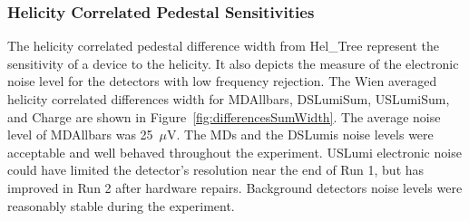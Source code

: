 \subsubsection{Helicity Correlated Pedestal Sensitivities}
\label{Helicity Correlated Pedestal Sensitivities}
The helicity correlated pedestal difference width from Hel\_Tree represent the sensitivity of a device to the helicity. It also depicts the measure of the electronic noise level for the detectors with low frequency rejection. The Wien averaged helicity correlated differences width for MDAllbars, DSLumiSum, USLumiSum, and Charge are shown in Figure~\ref{fig:differencesSumWidth}. The average noise level of MDAllbars was 25~$\mu$V.
The MDs and the DSLumis noise levels were acceptable and well behaved throughout the experiment. USLumi electronic noise could have limited the detector's resolution near the end of Run 1, but has improved in Run 2 after hardware repairs. Background detectors noise levels were reasonably stable during the experiment.


